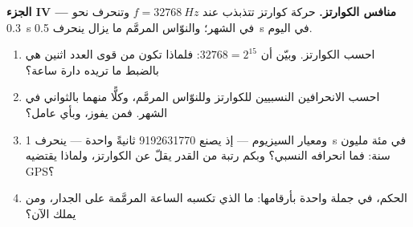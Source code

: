\begin{problem}
\medskip
\noindent\textbf{الجزء IV --- منافس الكوارتز.} حركة كوارتز
تتذبذب عند $f = \qty{32768}{Hz}$ وتنحرف نحو
\qty{0.3}{s} في الشهر؛ والنوّاس المرمَّم ما يزال ينحرف
\qty{0.5}{s} في اليوم.
\begin{enumerate}[resume]
  \item احسب  الكوارتز. وبيّن أن $\num{32768} = 2^{15}$: فلماذا تكون 
        من قوى العدد اثنين هي بالضبط ما تريده دارة ساعة؟
  \item احسب الانحرافين النسبيين للكوارتز وللنوّاس المرمَّم،
        وكلًّا منهما بالثواني في الشهر. فمن يفوز، وبأي عامل؟
  \item ومعيار السيزيوم --- إذ يصنع \num{9192631770}  ثانيةً
        واحدة --- ينحرف \qty{1}{s} في مئة مليون سنة: فما
        انحرافه النسبي؟ وبكم رتبة من القدر يقلّ عن الكوارتز،
        ولماذا يقتضيه GPS؟
  \item الحكم، في جملة واحدة بأرقامها: ما الذي تكسبه الساعة المرمَّمة
        على الجدار، ومن يملك  الآن؟
\end{enumerate}
\end{problem}
